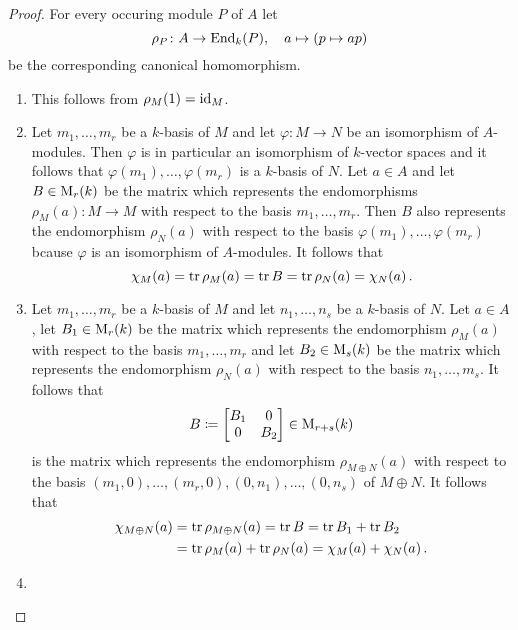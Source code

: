 \begin{proof}
  For every occuring module $P$ of $A$ let
  \[
            \rho_P
    \colon  A
    \to     \operatorname{End}_k(P),
    \quad   a
    \mapsto (p \mapsto ap)
  \]
  be the corresponding canonical homomorphism.
  \begin{enumerate}
    \item
      This follows from $\rho_M(1) = \operatorname{id}_M$.
    \item
      Let $m_1, \dotsc, m_r$ be a $k$-basis of $M$ and let $\varphi \colon M \to N$ be an isomorphism of $A$-modules.
      Then $\varphi$ is in particular an isomorphism of $k$-vector spaces and it follows that $\varphi(m_1), \dotsc, \varphi(m_r)$ is a $k$-basis of $N$.
      Let $a \in A$ and let $B \in \operatorname{M}_r(k)$ be the matrix which represents the endomorphisms $\rho_M(a) \colon M \to M$ with respect to the basis $m_1, \dotsc, m_r$.
      Then $B$ also represents the endomorphism $\rho_N(a)$ with respect to the basis $\varphi(m_1), \dotsc, \varphi(m_r)$ bcause $\varphi$ is an isomorphism of $A$-modules.
      It follows that
      \[
          \chi_M(a)
        = \operatorname{tr} \rho_M(a)
        = \operatorname{tr} B
        = \operatorname{tr} \rho_N(a)
        = \chi_N(a) \,.
      \]
    \item
      Let $m_1, \dotsc, m_r$ be a $k$-basis of $M$ and let $n_1, \dotsc, n_s$ be a $k$-basis of $N$.
      Let $a \in A$, let $B_1 \in \operatorname{M}_r(k)$ be the matrix which represents the endomorphism $\rho_M(a)$ with respect to the basis $m_1, \dotsc, m_r$ and let $B_2 \in \operatorname{M}_s(k)$ be the matrix which represents the endomorphism $\rho_N(a)$ with respect to the basis $n_1, \dotsc, m_s$.
      It follows that
      \[
                  B
        \coloneqq  \begin{bmatrix}
                    B_1 & 0 \\
                    0   & B_2
                  \end{bmatrix}
        \in       \operatorname{M}_{r+s}(k)
      \]
      is the matrix which represents the endomorphism $\rho_{M \oplus N}(a)$ with respect to the basis $(m_1, 0), \dotsc, (m_r, 0), (0, n_1), \dotsc, (0, n_s)$ of $M \oplus N$.
      It follows that
      \begin{align*}
            \chi_{M \oplus N}(a)
        &=  \operatorname{tr} \rho_{M \oplus N}(a)
         =  \operatorname{tr} B
         =  \operatorname{tr} B_1 + \operatorname{tr} B_2 \\
        &=  \operatorname{tr} \rho_M(a) + \operatorname{tr} \rho_N(a)
         =  \chi_M(a) + \chi_N(a) \,.
      \end{align*}
    \item

\end{enumerate}
\end{proof}
